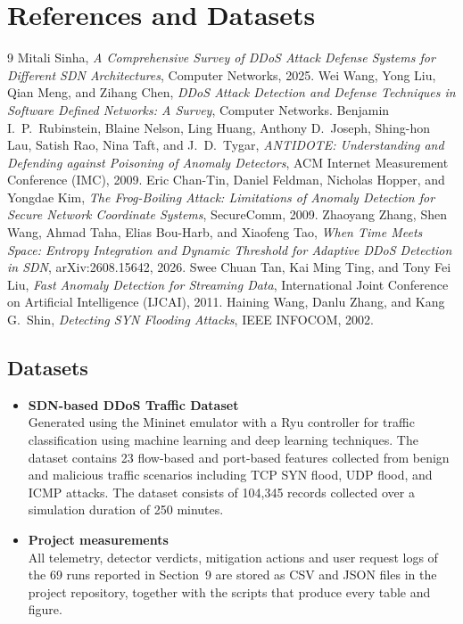 \documentclass[12pt,a4paper]{article}
\begin{document}
\newpage
\section*{References and Datasets}
\renewcommand{\refname}{References}
\begin{thebibliography}{9}
 Mitali Sinha, \emph{A Comprehensive Survey of DDoS Attack
Defense Systems for Different SDN Architectures}, Computer Networks, 2025.
 Wei Wang, Yong Liu, Qian Meng, and Zihang Chen, \emph{DDoS
Attack Detection and Defense Techniques in Software Defined Networks: A Survey},
Computer Networks.
 Benjamin I.\ P.\ Rubinstein, Blaine Nelson, Ling Huang,
Anthony D.\ Joseph, Shing-hon Lau, Satish Rao, Nina Taft, and J.\ D.\ Tygar,
\emph{ANTIDOTE: Understanding and Defending against Poisoning of Anomaly
Detectors}, ACM Internet Measurement Conference (IMC), 2009.
 Eric Chan-Tin, Daniel Feldman, Nicholas Hopper, and Yongdae
Kim, \emph{The Frog-Boiling Attack: Limitations of Anomaly Detection for Secure
Network Coordinate Systems}, SecureComm, 2009.
 Zhaoyang Zhang, Shen Wang, Ahmad Taha, Elias Bou-Harb, and
Xiaofeng Tao, \emph{When Time Meets Space: Entropy Integration and Dynamic
Threshold for Adaptive DDoS Detection in SDN}, arXiv:2608.15642, 2026.
 Swee Chuan Tan, Kai Ming Ting, and Tony Fei Liu, \emph{Fast
Anomaly Detection for Streaming Data}, International Joint Conference on
Artificial Intelligence (IJCAI), 2011.
 Haining Wang, Danlu Zhang, and Kang G.\ Shin,
\emph{Detecting SYN Flooding Attacks}, IEEE INFOCOM, 2002.
\end{thebibliography}

\subsection*{Datasets}
\begin{itemize}
  \item \textbf{SDN-based DDoS Traffic Dataset}\\
  Generated using the Mininet emulator with a Ryu controller for traffic
  classification using machine learning and deep learning techniques. The
  dataset contains 23 flow-based and port-based features collected from benign
  and malicious traffic scenarios including TCP SYN flood, UDP flood, and ICMP
  attacks. The dataset consists of 104,345 records collected over a simulation
  duration of 250 minutes.
  \item \textbf{Project measurements}\\
  All telemetry, detector verdicts, mitigation actions and user request logs of
  the 69 runs reported in Section~9 are stored as CSV and JSON files in the
  project repository, together with the scripts that produce every table and
  figure.
\end{itemize}
\end{document}
